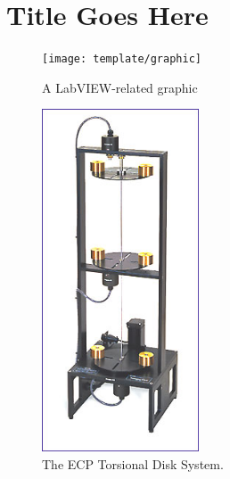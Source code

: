 \section{Title Goes Here}  

\begin{figure}[h!]
\centering
\texttt{[image: template/graphic]}
\caption{A LabVIEW-related graphic}
\label{fig-LabVIEWgraphic}
\end{figure}

\begin{figure}
\begin{center}
\includegraphics[height=4in]{Lab2/model205}
\end{center}
\caption{The ECP Torsional Disk System.}
\label{fig-ecp}
\end{figure}



